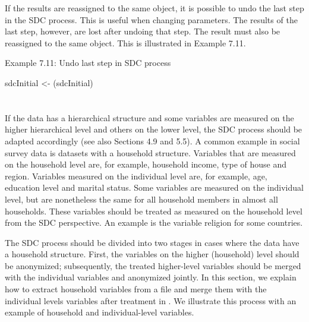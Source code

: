 \documentclass[letterpaper,10pt,english]{sphinxmanual}
\begin{document}
If the results are reassigned to the same  object, it is
possible to undo the last step in the SDC process. This is useful when
changing parameters. The results of the last step, however, are lost
after undoing that step.  The result must also be reassigned
to the same object. This is illustrated in Example 7.11.

Example 7.11: Undo last step in SDC process

\begin{DUlineblock}{0em}
\item[] 
\item[] sdcInitial \textless{}- (sdcInitial)
\end{DUlineblock}


\section{}
\label{\detokenize{sdcMicro:household-structure}}
If the data has a hierarchical structure and some variables are measured
on the higher hierarchical level and others on the lower level, the SDC
process should be adapted accordingly (see also Sections 4.9 and 5.5). A
common example in social survey data is datasets with a household
structure. Variables that are measured on the household level are, for
example, household income, type of house and region. Variables measured
on the individual level are, for example, age, education level and
marital status. Some variables are measured on the individual level, but
are nonetheless the same for all household members in almost all
households. These variables should be treated as measured on the
household level from the SDC perspective. An example is the variable
religion for some countries.

The SDC process should be divided into two stages in cases where the
data have a household structure. First, the variables on the higher
(household) level should be anonymized; subsequently, the treated
higher-level variables should be merged with the individual variables
and anonymized jointly. In this section, we explain how to extract
household variables from a file and merge them with the individual
levels variables after treatment in . We illustrate this process with
an example of household and individual-level variables.
\end{document}
